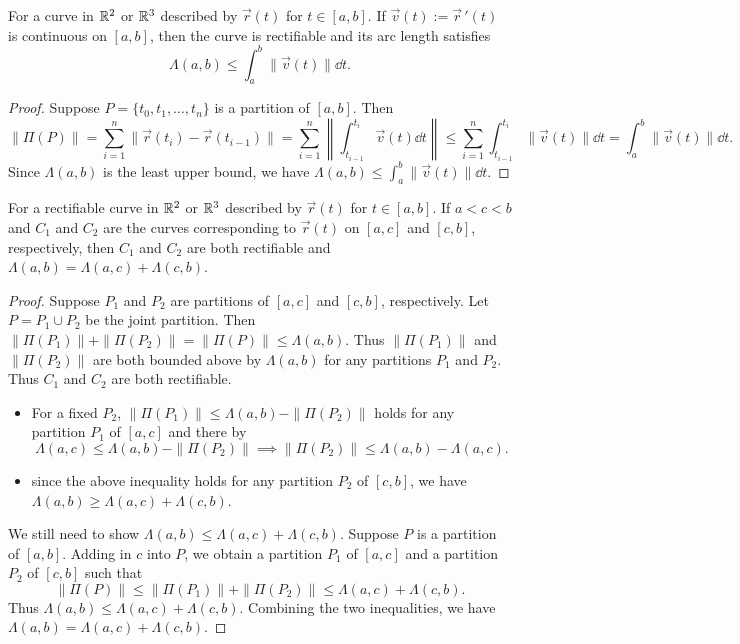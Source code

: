 \documentclass[a4paper]{ctexart}
\begin{document}
    \begin{mythm}
        For a curve in $\mathbb{R}^2$ or $\mathbb{R}^3$ described by $\vec r(t)$ for $t\in [a,b]$. If $\vec v(t) := \vec r\,'(t)$ is continuous on $[a,b]$, then the curve is rectifiable and its arc length satisfies
        $$ \Lambda(a,b) \le \int_a^b \| \vec v(t)\| \dd t. $$

    \end{mythm}
    \begin{proof}
        Suppose $P = \{t_0, t_1, \ldots, t_n\}$ is a partition of $[a,b]$. Then
        $$ \| \Pi (P)\| = \sum_{i=1}^n \| \vec r(t_i) - \vec r(t_{i-1})\| = \sum_{i=1}^n \left\| \int_{t_{i-1}}^{t_i} \vec v(t) \dd t \right\| \le \sum_{i=1}^n \int_{t_{i-1}}^{t_i} \| \vec v(t)\| \dd t = \int_a^b \| \vec v(t)\| \dd t. $$
        Since $\Lambda (a,b) $ is the least upper bound, we have $\Lambda(a,b)\displaystyle \le \int_a^b \| \vec v(t)\| \dd t$.
    \end{proof}
    \begin{mythm}
        For a rectifiable curve in $\mathbb{R}^2$ or $\mathbb{R}^3$ described by $\vec r(t)$ for $t\in [a,b]$. If $a<c<b$ and $C_1$ and $C_2$ are the curves corresponding to $\vec r(t)$ on $[a,c]$ and $[c,b]$, respectively, then $C_1$ and $C_2$ are both rectifiable and $\Lambda(a,b) = \Lambda(a,c) + \Lambda(c,b)$.
    \end{mythm}
    \begin{proof}
        Suppose $P_1$ and $P_2$ are partitions of $[a,c]$ and $[c,b]$, respectively. Let $P = P_1 \cup P_2$ be the joint partition. Then $ \| \Pi (P_1)\| + \| \Pi (P_2)\| = \| \Pi (P)\| \le \Lambda(a,b)$. Thus $\| \Pi (P_1)\|$ and $\| \Pi (P_2)\|$ are both bounded above by $\Lambda(a,b)$ for any partitions $P_1$ and $P_2$. Thus $C_1$ and $C_2$ are both rectifiable.
        \begin{itemize}
            \item For a fixed $P_2$, $\| \Pi (P_1)\|  \le \Lambda(a,b) - \| \Pi (P_2)\|$ holds for any partition $P_1$ of $[a,c]$ and there by $$\Lambda(a,c) \le \Lambda(a,b) - \| \Pi (P_2)\| \implies \| \Pi (P_2) \| \le \Lambda(a,b) - \Lambda(a,c).$$
            \item since the above inequality holds for any partition $P_2$ of $[c,b]$, we have $\Lambda(a,b) \ge \Lambda(a,c) + \Lambda(c,b)$.
        \end{itemize}
        We still need to show $\Lambda(a,b) \le \Lambda(a,c) + \Lambda(c,b)$. Suppose $P$ is a partition of $[a,b]$. Adding in $c$ into $P$, we obtain a partition $P_1$ of $[a,c]$ and a partition $P_2$ of $[c,b]$ such that
        $$ \| \Pi (P)\| \le \| \Pi (P_1)\| + \| \Pi (P_2)\| \le \Lambda(a,c) + \Lambda(c,b). $$
        Thus $\Lambda(a,b) \le \Lambda(a,c) + \Lambda(c,b)$. Combining the two inequalities, we have $\Lambda(a,b) = \Lambda(a,c) + \Lambda(c,b)$.
    \end{proof}
\end{document}

